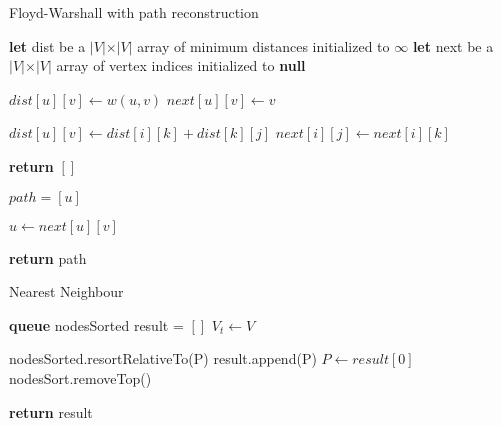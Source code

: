 \documentclass{article}
\begin{document}
\begin{algorithm}[h]
\caption{Floyd-Warshall with path reconstruction}
\begin{algorithmic}[1]

\State \textbf{let} dist be a $\vert V \vert \times \vert V \vert$ array of minimum distances initialized to $\infty$
\State \textbf{let} next be a $\vert V \vert \times \vert V \vert$ array of vertex indices initialized to \textbf{null}


	\State $dist[u][v] \gets w(u, v)$
	\State $next[u][v] \gets v$
\EndFor

				\State $dist[u][v] \gets dist[i][k] + dist[k][j]$
				\State $next[i][j] \gets next[i][k]$
			\EndIf
		\EndFor
	\EndFor
\EndFor

\EndProcedure


	\State \textbf{return} $[]$
\EndIf

\State $path = [u]$

	\State $u \gets next[u][v]$
	\State {}
\EndWhile

\State \textbf{return} path

\EndProcedure

\end{algorithmic}
\end{algorithm}

\begin{algorithm}[h]
\caption{Nearest Neighbour}
\begin{algorithmic}[1]

\State \textbf{queue} nodesSorted
\State result = $[]$
\State $V _{t} \gets V$

	\State nodesSorted.resortRelativeTo(P)
	\State result.append(P)
	\State $P \gets result[0]$
	\State nodesSort.removeTop()
\EndWhile

\State \textbf{return} result
\EndProcedure

\end{algorithmic}
\end{algorithm}
\end{document}
